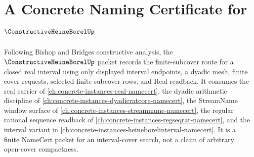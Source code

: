 \chapter{A Concrete Naming Certificate for $\ConstructiveHeineBorelUp$}
\label{ch:concrete-instances-constructive-heine-borel-namecert}

Following Bishop and Bridges constructive analysis, the $\ConstructiveHeineBorelUp$ packet records the finite-subcover route for a closed real interval using only displayed interval endpoints, a dyadic mesh, finite cover requests, selected finite subcover rows, and Real readback. It consumes the real carrier of \autoref{ch:concrete-instances-real-namecert}, the dyadic arithmetic discipline of \autoref{ch:concrete-instances-dyadicratcore-namecert}, the StreamName window surface of \autoref{ch:concrete-instances-streamname-namecert}, the regular rational sequence readback of \autoref{ch:concrete-instances-regseqrat-namecert}, and the interval variant in \autoref{ch:concrete-instances-heineborelinterval-namecert}. It is a finite NameCert packet for an interval-cover search, not a claim of arbitrary open-cover compactness.

